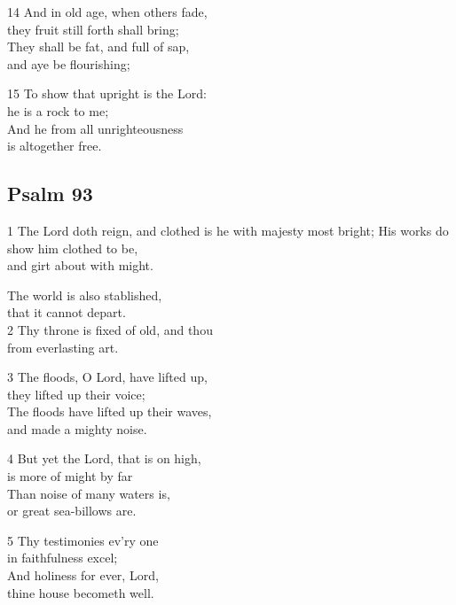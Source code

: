 14 And in old age, when others fade,\\
they fruit still forth shall bring;\\
They shall be fat, and full of sap,\\
and aye be flourishing;

15 To show that upright is the Lord:\\
he is a rock to me;\\
And he from all unrighteousness\\
is altogether free.

\begin{center}
\quad{}\quad{}
\end{center}

\subsection*{Psalm 93}

1 The Lord doth reign, and clothed is he
with majesty most bright;
His works do show him clothed to be,\\
and girt about with might.

The world is also stablished,\\
that it cannot depart.\\
2 Thy throne is fixed of old, and thou\\
from everlasting art.

3 The floods, O Lord, have lifted up,\\
they lifted up their voice;\\
The floods have lifted up their waves,\\
and made a mighty noise.

4 But yet the Lord, that is on high,\\
is more of might by far\\
Than noise of many waters is,\\
or great sea-billows are.

5 Thy testimonies ev’ry one\\
in faithfulness excel;\\
And holiness for ever, Lord,\\
thine house becometh well.

\begin{center}
\quad{}\quad{}
\end{center}


